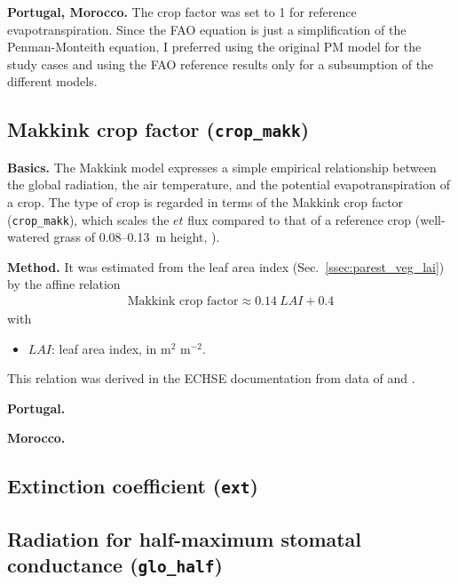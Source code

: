 \documentclass{scrreprt}
\newenvironment{denseitem}{
  \begin{itemize}
    \setlength{\itemsep}{0pt}
    \setlength{\parskip}{0pt}
    \setlength{\parsep}{0pt}
}{
  \end{itemize}
}
\begin{document}
\textbf{Portugal, Morocco.}
The crop factor was set to 1 for reference evapotranspiration.
Since the FAO equation is just a simplification of the Penman-Monteith equation, I preferred using the original PM model for the study cases and using the FAO reference results only for a subsumption of the different models.

\subsection{Makkink crop factor (\texttt{crop\_makk})} \label{ssec:parest_veg_cropmakk}

\textbf{Basics.}
The Makkink model expresses a simple empirical relationship between the global radiation, the air temperature, and the potential evapotranspiration of a crop.
The type of crop is regarded in terms of the Makkink crop factor (\verb!crop_makk!), which scales the $et$ flux compared to that of a reference crop (well-watered grass of 0.08--0.13~m height, \citealt{feddes87}).

\textbf{Method.}
It was estimated from the leaf area index (Sec.~\ref{ssec:parest_veg_lai}) by the affine relation
\begin{align} \label{eq:cropmakk}
  \text{Makkink~crop~factor} \approx 0.14 ~ LAI + 0.4
\end{align}
%
with
\begin{denseitem}
  \item[] $LAI$: leaf area index, in m$^2$ m$^{-2}$.
\end{denseitem}
%
This relation was derived in the ECHSE documentation from data of \citet{feddes87} and \citet{ludwig06}.

\textbf{Portugal.}

\textbf{Morocco.}

\subsection{Extinction coefficient (\texttt{ext})} \label{ssec:parest_veg_ext}

\subsection{Radiation for half-maximum stomatal conductance (\texttt{glo\_half})} \label{ssec:parest_veg_glohalf}
\end{document}
